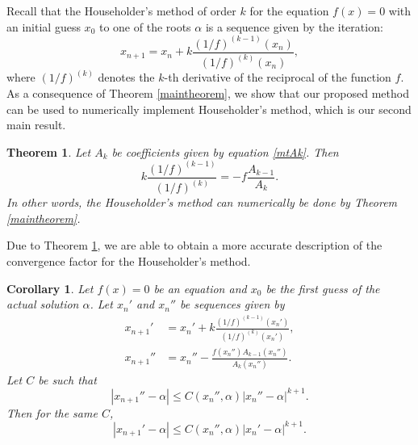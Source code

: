 \documentclass{article}
\newtheorem{theorem}{Theorem}%
\newtheorem{corollary}{Corollary}[theorem]
\begin{document}
Recall that the Householder's method of order $k$ for the equation $f(x)=0$ with an initial guess $x_{0}$ to one of the roots $\alpha$ is a sequence given by the iteration:
\begin{equation}
	x_{n+1}= x_{n}+k\frac{(1/f)^{(k-1)}(x_{n})}{(1/f)^{(k)}(x_{n})},
\end{equation}
where $(1/f)^{(k)}$ denotes the $k$-th derivative of the reciprocal of the function $f$. As a consequence of Theorem \ref{maintheorem}, we show that our proposed method can be used to numerically implement Householder's method, which is our second main result.
\medskip
\begin{theorem}\label{intro-Theorem-Householder}
	Let $A_{k}$ be coefficients given by equation \eqref{mtAk}.  Then
	\[
	k\frac{(1/f)^{(k-1)}}{(1/f)^{(k)}} = -f\frac{A_{k-1}}{A_{k}}.
	\]
	In other words, the Householder's method can numerically be done by Theorem \ref{maintheorem}.
\end{theorem}
\medskip
Due to Theorem \ref{intro-Theorem-Householder}, we are able to obtain a more accurate description of the convergence factor for the Householder's method.
\medskip
\begin{corollary}\label{maintheorem-cor}
	Let $f(x)=0$ be an equation and $x_{0}$ be the first guess of the actual solution $\alpha$. Let $x_{n}'$ and $x_{n}''$ be sequences given  by
	\begin{equation}
		\begin{aligned}
			x_{n+1}' &= x_{n}' + k\frac{(1/f)^{(k-1)}(x_{n}')}{(1/f)^{(k)}(x_{n}')},\\
			x_{n+1}'' &= x_{n}'' -\frac{f(x_{n}'')A_{k-1}(x_{n}'')}{A_{k}(x_{n}'')}.
		\end{aligned}
	\end{equation}
	Let $C$ be such that 
	\[
	|x_{n+1}''-\alpha|\leq C(x_{n}'',\alpha)|x_{n}''-\alpha|^{k+1}.
	\]
	Then for the same $C$,
	\[
	|x_{n+1}'-\alpha|\leq C(x_{n}'',\alpha)|x_{n}'-\alpha|^{k+1}.
	\]
\end{corollary}
\medskip
\end{document}
